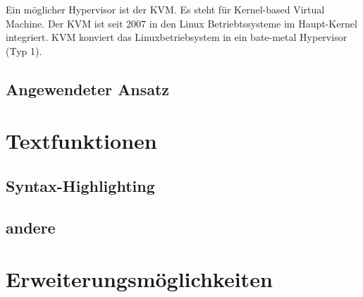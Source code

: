 \documentclass[10pt]{article}
\begin{document}
	Ein möglicher Hypervisor ist der KVM. Es steht für Kernel-based Virtual Machine. Der KVM ist seit 2007 in den Linux Betriebtssysteme im Haupt-Kernel integriert. KVM konviert das Linuxbetriebsystem in ein bate-metal Hypervisor (Typ 1). 
	
	
	
	\pagebreak
	\subsection{Angewendeter Ansatz}
	\pagebreak
	\section{Textfunktionen}
	\subsection{Syntax-Highlighting}
	\subsection{andere}
	\pagebreak
	\section{Erweiterungsmöglichkeiten}
	\pagebreak
	\listoffigures
	
	
\end{document}
